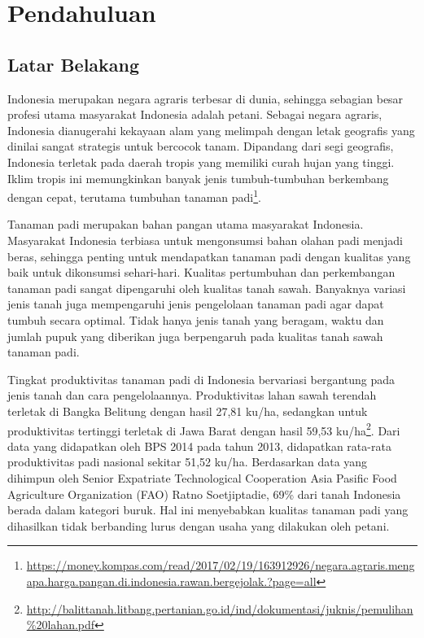 
\chapter{Pendahuluan}
\label{chap:intro}
   
\section{Latar Belakang}
\label{sec:label}


Indonesia merupakan negara agraris terbesar di dunia, sehingga sebagian besar profesi utama masyarakat Indonesia
adalah petani. Sebagai negara agraris, Indonesia dianugerahi kekayaan alam yang melimpah dengan
letak geografis yang dinilai sangat strategis untuk bercocok tanam. Dipandang dari segi geografis, Indonesia
terletak pada daerah tropis yang memiliki curah hujan yang tinggi. Iklim tropis ini memungkinkan banyak
jenis tumbuh-tumbuhan berkembang dengan cepat, terutama tumbuhan tanaman padi\footnote{\url{https://money.kompas.com/read/2017/02/19/163912926/negara.agraris.mengapa.harga.pangan.di.indonesia.rawan.bergejolak.?page=all}}.

Tanaman padi merupakan bahan pangan utama masyarakat Indonesia. Masyarakat Indonesia terbiasa untuk mengonsumsi bahan olahan padi menjadi beras, sehingga penting untuk mendapatkan tanaman padi dengan kualitas yang baik untuk dikonsumsi sehari-hari. Kualitas pertumbuhan dan perkembangan tanaman padi sangat dipengaruhi oleh kualitas tanah sawah. Banyaknya variasi jenis tanah juga mempengaruhi jenis pengelolaan
tanaman padi agar dapat tumbuh secara optimal. Tidak hanya jenis tanah yang beragam, waktu dan jumlah pupuk yang diberikan juga berpengaruh pada kualitas tanah sawah tanaman padi.

Tingkat produktivitas tanaman padi di Indonesia bervariasi bergantung pada jenis tanah dan cara pengelolaannya.
Produktivitas lahan sawah terendah terletak di Bangka Belitung dengan hasil 27,81 ku/ha,
sedangkan untuk produktivitas tertinggi terletak di Jawa Barat dengan hasil 59,53 ku/ha\footnote{\url{http://balittanah.litbang.pertanian.go.id/ind/dokumentasi/juknis/pemulihan\%20lahan.pdf}}. Dari data yang didapatkan oleh BPS 2014 pada tahun 2013, didapatkan rata-rata produktivitas padi nasional sekitar 51,52 ku/ha. Berdasarkan data yang dihimpun oleh Senior Expatriate Technological Cooperation Asia Pasific Food Agriculture Organization (FAO) Ratno Soetjiptadie, 69\% dari tanah Indonesia berada dalam kategori buruk. Hal ini menyebabkan kualitas tanaman padi yang dihasilkan tidak berbanding lurus dengan usaha yang dilakukan oleh petani.

